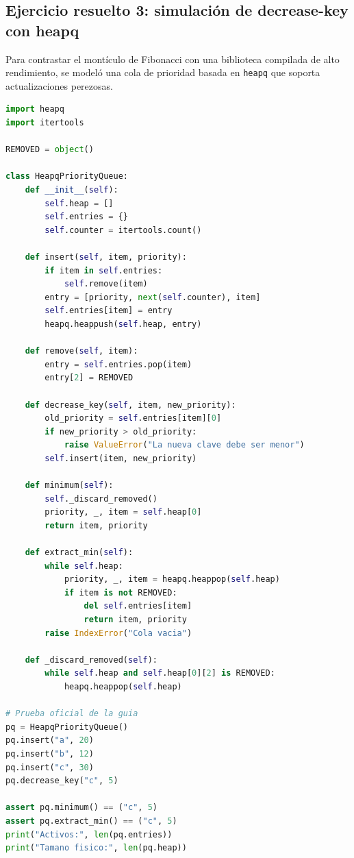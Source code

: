 \subsection{Ejercicio resuelto 3: simulación de decrease-key con heapq}
Para contrastar el montículo de Fibonacci con una biblioteca compilada de alto rendimiento, se modeló una cola de prioridad basada en \texttt{heapq} que soporta actualizaciones perezosas.

\begin{lstlisting}[language=Python, caption={Código del Ejercicio Resuelto 3 (cola de prioridad con heapq perezoso)}, label={lst:resuelto_3}]
import heapq
import itertools

REMOVED = object()

class HeapqPriorityQueue:
    def __init__(self):
        self.heap = []
        self.entries = {}
        self.counter = itertools.count()

    def insert(self, item, priority):
        if item in self.entries:
            self.remove(item)
        entry = [priority, next(self.counter), item]
        self.entries[item] = entry
        heapq.heappush(self.heap, entry)

    def remove(self, item):
        entry = self.entries.pop(item)
        entry[2] = REMOVED

    def decrease_key(self, item, new_priority):
        old_priority = self.entries[item][0]
        if new_priority > old_priority:
            raise ValueError("La nueva clave debe ser menor")
        self.insert(item, new_priority)

    def minimum(self):
        self._discard_removed()
        priority, _, item = self.heap[0]
        return item, priority

    def extract_min(self):
        while self.heap:
            priority, _, item = heapq.heappop(self.heap)
            if item is not REMOVED:
                del self.entries[item]
                return item, priority
        raise IndexError("Cola vacia")

    def _discard_removed(self):
        while self.heap and self.heap[0][2] is REMOVED:
            heapq.heappop(self.heap)

# Prueba oficial de la guia
pq = HeapqPriorityQueue()
pq.insert("a", 20)
pq.insert("b", 12)
pq.insert("c", 30)
pq.decrease_key("c", 5)

assert pq.minimum() == ("c", 5)
assert pq.extract_min() == ("c", 5)
print("Activos:", len(pq.entries))
print("Tamano fisico:", len(pq.heap))
\end{lstlisting}

